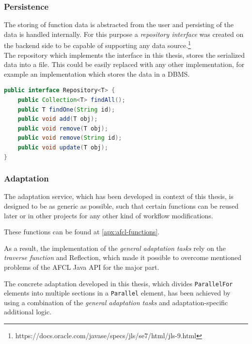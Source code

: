 \documentclass[a4paper,top=25mm,bottom=25mm,12pt,pdftex,halfparskip,twoside,bibtotoc,numbers=noenddot]{scrbook}
\begin{document}
\subsubsection{Persistence}
\label{sec:backend-persistence}

The storing of function data is abstracted from the user and persisting of the data is handled internally. For this purpose a \textit{repository interface} was created on the backend side to be capable of supporting any data source.\footnote{https://docs.oracle.com/javase/specs/jls/se7/html/jls-9.html}\\
The repository which implements the interface in this thesis, stores the serialized data into a file. This could be easily replaced with any other implementation, for example an implementation which stores the data in a DBMS.


\begin{lstlisting}[language=Java, caption=Repository Interface]
public interface Repository<T> {
    public Collection<T> findAll();
    public T findOne(String id);
    public void add(T obj);
    public void remove(T obj);
    public void remove(String id);
    public void update(T obj);
}
\end{lstlisting}

\subsubsection{Adaptation}
The adaptation service, which has been developed in context of this thesis, is designed to be as generic as possible, such that certain functions can be reused later or in other projects for any other kind of workflow modifications. 

These functions can be found at \ref{apx:afcl-functions}.


%

As a result, the implementation of the \textit{general adaptation tasks} rely on the \textit{traverse function} and Reflection, which made it possible to overcome mentioned problems of the AFCL Java API for the major part.

The concrete adaptation developed in this thesis, which divides \texttt{ParallelFor} elements into multiple sections in a \texttt{Parallel} element, has been achieved by using a combination of the \textit{general adaptation tasks} and adaptation-specific additional logic.
\end{document}

